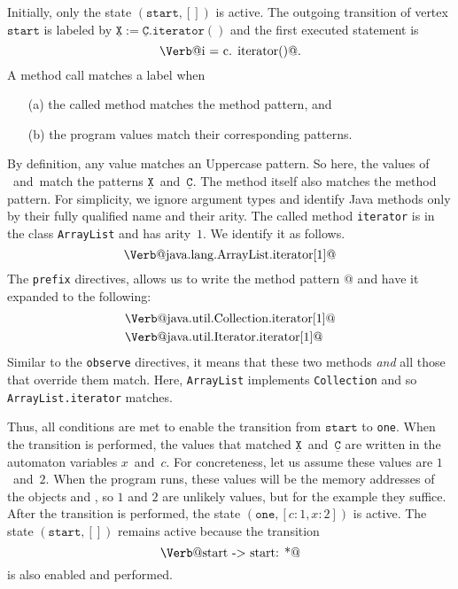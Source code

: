 \documentclass[9pt, preprint]{sigplanconf} %
\makeatletter
\newcommand{\pattern}[1]{\ensuremath{\mathtt{\underline{#1}}}}
\newcommand{\start}{\ensuremath{\mathtt{start}}\xspace}
\newcommand{\verbline}[2][]{\[\text{\Verb@#2@}#1\]}
\theoremstyle{definition}
\theoremstyle{remark}
\makeatother
\begin{document}
Initially, only the state $(\start,[])$ is active.
The outgoing transition of vertex \start is labeled by $\pattern X:=\pattern{C}.\mathtt{iterator}()$ and the first executed statement is \verbline[.]{i = c.\PY{n+na}{iterator}()}
A method call matches a label when
\begin{itemize}
\item[(a)] the called method matches the method pattern, and
\item[(b)] the program values match their corresponding patterns.
\end{itemize}
By definition, any value matches an Uppercase pattern.
So here, the values of \Verb@i@~and~\Verb@c@ match the patterns \pattern X~and~\pattern C.
The method itself also matches the method pattern.
For simplicity, we ignore argument types and identify Java methods only by their fully qualified name and their arity.
The called method \texttt{iterator} is in the class \texttt{ArrayList} and has arity~$1$.
We identify it as follows.
\verbline{java.lang.ArrayList.iterator[1]}
The \texttt{prefix} directives, allows us to write the method pattern \Verb@iterator[1]@
and have it expanded to the following:
\begin{align*}
&\text{\Verb@java.util.Collection.iterator[1]@} \\
&\text{\Verb@java.util.Iterator.iterator[1]@}
\end{align*}
Similar to the \texttt{observe} directives, it means that these two methods \emph{and} all those that override them match.
Here, \texttt{ArrayList} implements \texttt{Collection} and so\\
\texttt{ArrayList.iterator} matches.

Thus, all conditions are met to enable the transition from \start to \texttt{one}.
When the transition is performed, the values that matched \pattern X~and~\pattern C are written in the automaton variables $x$~and~$c$.
For concreteness, let us assume these values are $1$~and~$2$. When the
program runs, these values will be the memory addresses of the objects
\Verb@c@ and \Verb@i@, so $1$ and $2$ are unlikely values, but for the
example they suffice.
After the transition is performed, the state $(\mathtt{one},[c:1,x:2])$ is active.
The state $(\start,[])$ remains active because the transition \verbline{start -> start: *} is also enabled and performed.
\end{document}
